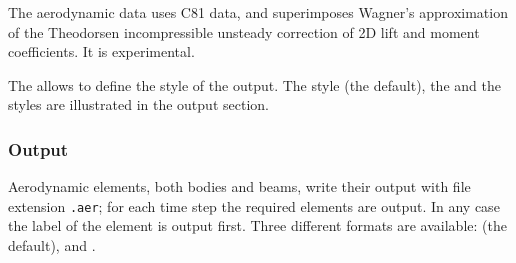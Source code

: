 The  aerodynamic data uses C81 data,
and superimposes Wagner's approximation of the Theodorsen incompressible
unsteady correction of 2D lift and moment coefficients.
It is experimental.

The  allows to define the style of the output.
The  style (the default), the  and the 
styles are illustrated in the output section.


\subsubsection{Output}
Aerodynamic elements, both bodies and beams, write their output with file
extension \texttt{.aer}; for each time step the required elements are output.
In any case the label of the element is output first.
Three different formats are available:  (the default),
 and .

